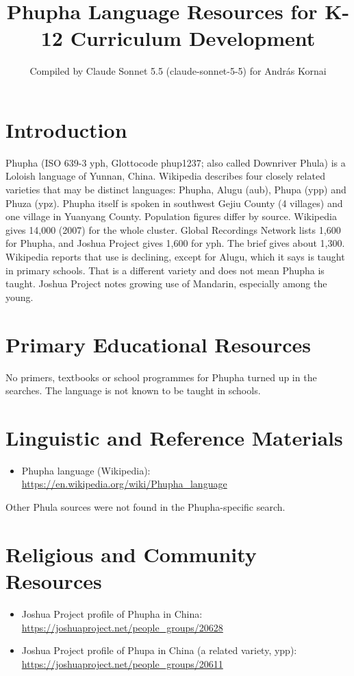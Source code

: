 \documentclass[12pt]{article}
\title{Phupha Language Resources for K-12 Curriculum Development}
\author{Compiled by Claude Sonnet 5.5 (claude-sonnet-5-5) for Andr\'as Kornai}
\date{}
\begin{document}
\maketitle

\section{Introduction}
Phupha (ISO 639-3 yph, Glottocode phup1237; also called Downriver Phula) is a Loloish language of Yunnan, China. Wikipedia describes four closely related varieties that may be distinct languages: Phupha, Alugu (aub), Phupa (ypp) and Phuza (ypz). Phupha itself is spoken in southwest Gejiu County (4 villages) and one village in Yuanyang County. Population figures differ by source. Wikipedia gives 14,000 (2007) for the whole cluster. Global Recordings Network lists 1,600 for Phupha, and Joshua Project gives 1,600 for yph. The brief gives about 1,300. Wikipedia reports that use is declining, except for Alugu, which it says is taught in primary schools. That is a different variety and does not mean Phupha is taught. Joshua Project notes growing use of Mandarin, especially among the young.

\section{Primary Educational Resources}
No primers, textbooks or school programmes for Phupha turned up in the searches. The language is not known to be taught in schools.

\section{Linguistic and Reference Materials}
\begin{itemize}
\item Phupha language (Wikipedia): \url{https://en.wikipedia.org/wiki/Phupha_language}
\end{itemize}
Other Phula sources were not found in the Phupha-specific search.

\section{Religious and Community Resources}
\begin{itemize}
\item Joshua Project profile of Phupha in China: \url{https://joshuaproject.net/people_groups/20628}
\item Joshua Project profile of Phupa in China (a related variety, ypp): \url{https://joshuaproject.net/people_groups/20611}
\end{itemize}
\end{document}
